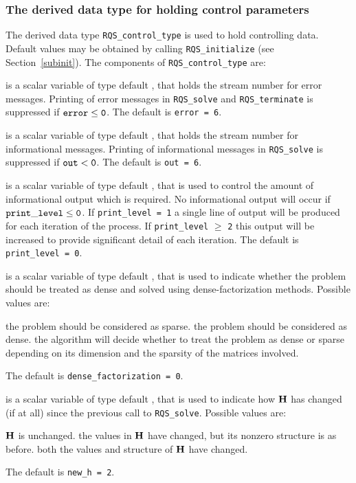 \documentclass{galahad}
\newcommand{\packagename}{RQS}
\begin{document}

\subsubsection{The derived data type for holding control
 parameters}\label{typecontrol}
The derived data type
{\tt \packagename\_control\_type}
is used to hold controlling data. Default values may be obtained by calling
{\tt \packagename\_initialize}
(see Section~\ref{subinit}). The components of
{\tt \packagename\_control\_type}
are:

\begin{description}
 is a scalar variable of type default \integer, that holds the
stream number for error messages.
Printing of error messages in
{\tt \packagename\_solve} and {\tt \packagename\_terminate}
is suppressed if ${\tt error} \leq {\tt 0}$.
The default is {\tt error = 6}.

 is a scalar variable of type default \integer, that holds the
stream number for informational messages.
Printing of informational messages in
{\tt \packagename\_solve} is suppressed if ${\tt out} < {\tt 0}$.
The default is {\tt out = 6}.

 is a scalar variable of type default \integer,
that is used
to control the amount of informational output which is required. No
informational output will occur if ${\tt print\_level} \leq {\tt 0}$. If
{\tt print\_level = 1} a single line of output will be produced for each
iteration of the process. If {\tt print\_level} $\geq$ {\tt 2} this output
will be increased to provide significant detail of each iteration.
The default is {\tt print\_level = 0}.

 is a scalar variable of type default \integer,
that is used to indicate whether the problem should be treated as dense
and solved using dense-factorization methods. Possible values are:
\begin{description}
 the problem should be considered as sparse.
 the problem should be considered as dense.
 the algorithm will decide whether to treat the
problem as dense or sparse depending on its dimension and the
sparsity of the matrices involved.
\end{description}
The default is {\tt dense\_factorization = 0}.

 is a scalar variable of type default \integer, that is used
to indicate how ${\mathbf{H}}$ has changed (if at all) since the previous call
to {\tt \packagename\_solve}. Possible values are:
\begin{description}
 ${\mathbf{H}}$ is unchanged.
 the values in ${\mathbf{H}}$ have changed, but its nonzero structure
is as before.
 both the values and structure of ${\mathbf{H}}$ have changed.
\end{description}
The default is {\tt new\_h = 2}.


\end{description}
\end{document}
